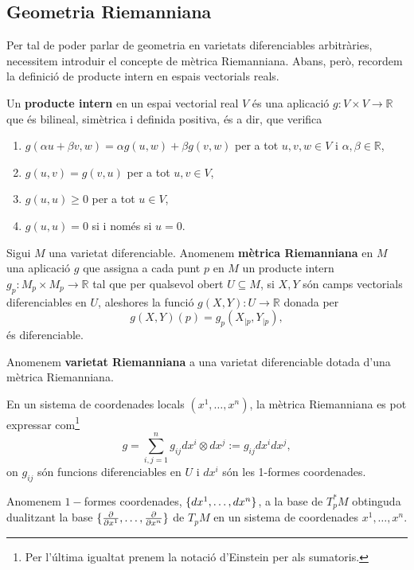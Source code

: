 \subsection{Geometria Riemanniana}
Per tal de poder parlar de geometria en varietats diferenciables arbitràries, necessitem introduir el concepte de mètrica Riemanniana. Abans, però, recordem la definició de producte intern en espais vectorials reals.
\begin{defi}
    Un \textbf{producte intern} en un espai vectorial real $V$ és una aplicació $g:V\times V\to\mathbb R$ que és bilineal, simètrica i definida positiva, és a dir, que verifica
    \begin{enumerate}
        \item $g(\alpha u + \beta v, w) = \alpha g(u,w) + \beta g(v,w)$ per a tot $u,v,w\in V$ i $\alpha,\beta\in\mathbb R$,
        \item $g(u,v) = g(v,u)$ per a tot $u,v\in V$,
        \item $g(u,u)\ge0$ per a tot $u\in V$,
        \item $g(u,u) = 0$ si i només si $u = 0$.
    \end{enumerate}
\end{defi}

\begin{defi}
    Sigui $M$ una varietat diferenciable. Anomenem \textbf{mètrica Riemanniana} en $M$ una aplicació $g$ que assigna a cada punt $p$ en $M$ un producte intern $g_p:M_p\times M_p\to\mathbb R$ tal que per qualsevol obert $U\subseteq M$, si $X,Y$ són camps vectorials diferenciables en $U$, aleshores la funció $g(X,Y):U\to\mathbb R$ donada per
    \begin{equation*}
        g(X,Y)(p) = g_p(X_{|p},Y_{|p}),
    \end{equation*}
    és diferenciable.
    
    Anomenem \textbf{varietat Riemanniana} a una varietat diferenciable dotada d'una mètrica Riemanniana.
\end{defi}
En un sistema de coordenades locals $(x^1,\dots,x^n)$, la mètrica Riemanniana es pot expressar com\footnote{Per l'última igualtat prenem la notació d'Einstein per als sumatoris.}
\begin{equation*}
    g = \sum_{i,j=1}^n g_{ij}dx^i\otimes dx^j := g_{ij}dx^idx^j,
\end{equation*}
on $g_{ij}$ són funcions diferenciables en $U$ i $dx^i$ són les 1-formes coordenades.

\begin{defi}
    Anomenem $1-$formes coordenades, $\{dx^1,\dots,dx^n\}$, a la base de $T_p^*M$ obtinguda dualitzant la base $\{\frac{\partial}{\partial x^1},\dots,\frac{\partial}{\partial x^n}\}$ de $T_pM$ en un sistema de coordenades $x^1,\dots,x^n$.
\end{defi}

